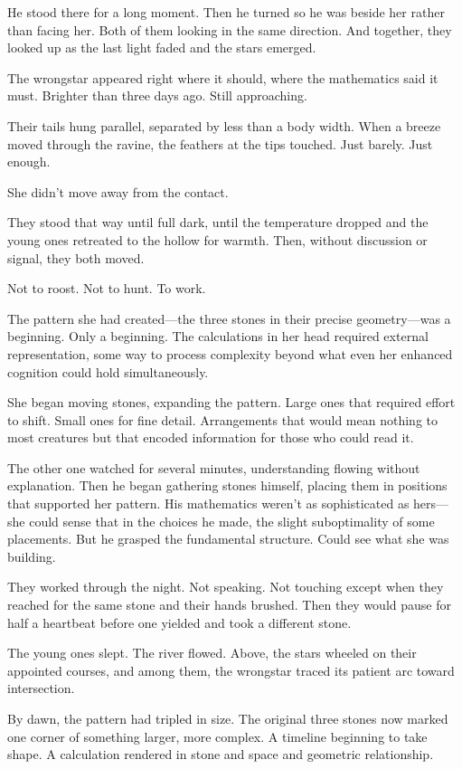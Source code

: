 He stood there for a long moment. Then he turned so he was beside her rather than facing her. Both of them looking in the same direction. And together, they looked up as the last light faded and the stars emerged.

The wrongstar appeared right where it should, where the mathematics said it must. Brighter than three days ago. Still approaching.

Their tails hung parallel, separated by less than a body width. When a breeze moved through the ravine, the feathers at the tips touched. Just barely. Just enough.

She didn't move away from the contact.

They stood that way until full dark, until the temperature dropped and the young ones retreated to the hollow for warmth. Then, without discussion or signal, they both moved.

Not to roost. Not to hunt. To work.

The pattern she had created—the three stones in their precise geometry—was a beginning. Only a beginning. The calculations in her head required external representation, some way to process complexity beyond what even her enhanced cognition could hold simultaneously.

She began moving stones, expanding the pattern. Large ones that required effort to shift. Small ones for fine detail. Arrangements that would mean nothing to most creatures but that encoded information for those who could read it.

The other one watched for several minutes, understanding flowing without explanation. Then he began gathering stones himself, placing them in positions that supported her pattern. His mathematics weren't as sophisticated as hers—she could sense that in the choices he made, the slight suboptimality of some placements. But he grasped the fundamental structure. Could see what she was building.

They worked through the night. Not speaking. Not touching except when they reached for the same stone and their hands brushed. Then they would pause for half a heartbeat before one yielded and took a different stone.

The young ones slept. The river flowed. Above, the stars wheeled on their appointed courses, and among them, the wrongstar traced its patient arc toward intersection.

By dawn, the pattern had tripled in size. The original three stones now marked one corner of something larger, more complex. A timeline beginning to take shape. A calculation rendered in stone and space and geometric relationship.

